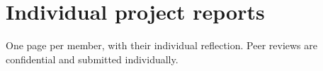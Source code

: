 \chapter{Individual project reports}
\label{app:reflections}

One page per member, with their individual reflection. Peer reviews are confidential and submitted individually.


\enlargethispage{2\baselineskip}
